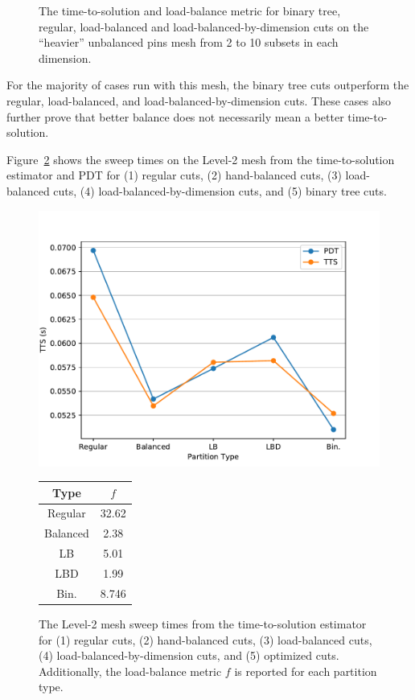 \documentclass[times,final]{elsarticle}
\begin{document}
\begin{figure}[h]
\begin{subfigure}[t]{0.49\textwidth}
  \end{subfigure}  
  \caption{The time-to-solution and load-balance metric for binary tree, regular, load-balanced and load-balanced-by-dimension cuts on the ``heavier'' unbalanced pins mesh from 2 to 10 subsets in each dimension.}
  \label{ubp_opt_heavy}
\end{figure}
For the majority of cases run with this mesh, the binary tree cuts outperform the regular, load-balanced, and load-balanced-by-dimension cuts. These cases also further prove that better balance does not necessarily mean a better time-to-solution.

Figure~\ref{level2_opt} shows the sweep times on the Level-2 mesh from the time-to-solution estimator and PDT for (1) regular cuts, (2) hand-balanced cuts, (3) load-balanced cuts, (4) load-balanced-by-dimension cuts, and (5) binary tree cuts.
\begin{figure}[h]
\begin{minipage}[c]{0.65\textwidth}
\centering
\includegraphics[scale=0.775]{../figures/level2_sweep_comp_best.pdf}
\end{minipage}
\begin{minipage}[c]{0.33\textwidth}
\begin{table}[H]
\centering
\begin{tabular}{c|c}
\textbf{Type} & \bf $f$ \\ \hline
Regular &  32.62 \\ \hline
Balanced & 2.38 \\ \hline
LB & 5.01 \\ \hline
LBD &  1.99\\ \hline
Bin. & 8.746 \\ \hline
\end{tabular}
\end{table}
\end{minipage}
\caption{The Level-2 mesh sweep times from the time-to-solution estimator for (1) regular cuts, (2) hand-balanced cuts, (3) load-balanced cuts, (4) load-balanced-by-dimension cuts, and (5) optimized cuts. Additionally, the load-balance metric $f$ is reported for each partition type. }
\label{level2_opt}
\end{figure}
\end{document}
